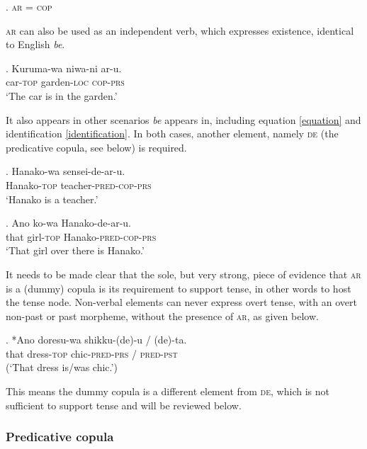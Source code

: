 \ex. \textsc{ar} = \textsc{cop}

\textsc{ar} can also be used as an independent verb, which expresses existence, identical to English \textit{be}.

\exg. Kuruma-wa niwa-ni ar-u.\\
car-\textsc{top} garden-\textsc{loc} \textsc{cop-prs}\\
`The car is in the garden.’

It also appears in other scenarios \textit{be} appears in, including equation \ref{equation} and identification \ref{identification}. In both cases, another element, namely \textsc{de} (the predicative copula, see below) is required.

\exg. Hanako-wa sensei-de-ar-u.\\
Hanako-\textsc{top} teacher-\textsc{pred-cop-prs}\\
`Hanako is a teacher.' \label{equation}

\exg. Ano ko-wa Hanako-de-ar-u.\\
that girl-\textsc{top} Hanako-\textsc{pred-cop-prs}\\
`That girl over there is Hanako.' \label{identification}

It needs to be made clear that the sole, but very strong, piece of evidence that \textsc{ar} is a (dummy) copula is its requirement to support tense, in other words to host the tense node. Non-verbal elements can never express overt tense, with an overt non-past or past morpheme, without the presence of \textsc{ar}, as given below.

\exg. *Ano doresu-wa shikku-(de)-u / (de)-ta.\\
that dress-\textsc{top} chic-\textsc{pred-prs} / \textsc{pred-pst}\\
(`That dress is/was chic.’)

This means the dummy copula is a different element from \textsc{de}, which is not sufficient to support tense and will be reviewed below.

\subsubsection{Predicative copula} \label{chapter pred}

